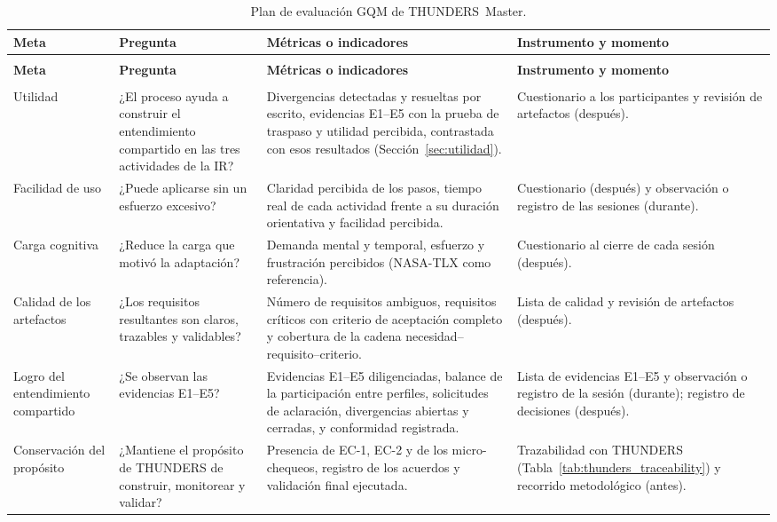 \documentclass[12pt,letterpaper,oneside]{report}
\begin{document}
{\footnotesize
\setlength{\tabcolsep}{3.5pt}
\renewcommand{\arraystretch}{1.08}
\begin{xltabular}{\textwidth}{@{}>{\raggedright\arraybackslash}p{0.14\textwidth}
                                >{\raggedright\arraybackslash}p{0.22\textwidth}
                                >{\raggedright\arraybackslash}X
                                >{\raggedright\arraybackslash}p{0.23\textwidth}@{}}
\caption{Plan de evaluación GQM de THUNDERS~Master.\label{tab:gqm}}\\
\toprule
\textbf{Meta} & \textbf{Pregunta} & \textbf{Métricas o indicadores} &
\textbf{Instrumento y momento} \\
\midrule
\endfirsthead
{}\\
\toprule
\textbf{Meta} & \textbf{Pregunta} & \textbf{Métricas o indicadores} &
\textbf{Instrumento y momento} \\
\midrule
\endhead
\midrule
{}\\
\endfoot
\bottomrule
\endlastfoot
Utilidad
& ¿El proceso ayuda a construir el entendimiento compartido en las tres
  actividades de la IR?
& Divergencias detectadas y resueltas por escrito, evidencias E1--E5 con la
  prueba de traspaso y utilidad percibida, contrastada con esos resultados
  (Sección~\ref{sec:utilidad}).
& Cuestionario a los participantes y revisión de artefactos (después). \\
\addlinespace
Facilidad de uso
& ¿Puede aplicarse sin un esfuerzo excesivo?
& Claridad percibida de los pasos, tiempo real de cada actividad frente a su
  duración orientativa y facilidad percibida.
& Cuestionario (después) y observación o registro de las sesiones (durante). \\
\addlinespace
Carga cognitiva
& ¿Reduce la carga que motivó la adaptación?
& Demanda mental y temporal, esfuerzo y frustración percibidos (NASA-TLX
  como referencia).
& Cuestionario al cierre de cada sesión (después). \\
\addlinespace
Calidad de los artefactos
& ¿Los requisitos resultantes son claros, trazables y validables?
& Número de requisitos ambiguos, requisitos críticos con criterio de
  aceptación completo y cobertura de la cadena necesidad--requisito--criterio.
& Lista de calidad y revisión de artefactos (después). \\
\addlinespace
Logro del entendimiento compartido
& ¿Se observan las evidencias E1--E5?
& Evidencias E1--E5 diligenciadas, balance de la participación entre
  perfiles, solicitudes de aclaración, divergencias abiertas y cerradas, y
  conformidad registrada.
& Lista de evidencias E1--E5 y observación o registro de la sesión (durante); registro de
  decisiones (después). \\
\addlinespace
Conservación del propósito
& ¿Mantiene el propósito de THUNDERS de construir, monitorear y validar?
& Presencia de EC-1, EC-2 y de los micro-chequeos, registro de los acuerdos
  y validación final ejecutada.
& Trazabilidad con THUNDERS (Tabla~\ref{tab:thunders_traceability}) y recorrido
  metodológico (antes). \\
\end{xltabular}}
\end{document}
